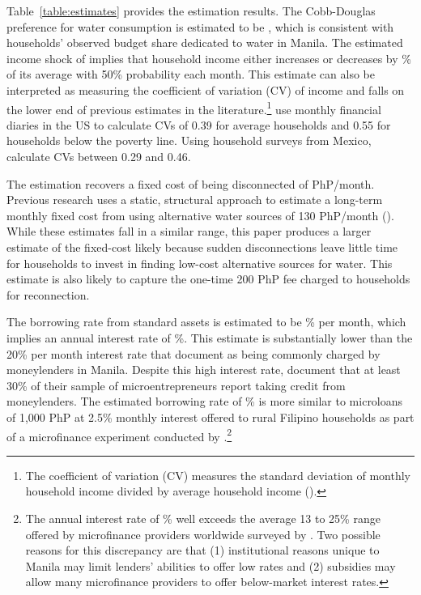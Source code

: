 \documentclass[12pt]{article}
\begin{document}
Table~\ref{table:estimates} provides the estimation results.  The Cobb-Douglas preference for water consumption is estimated to be \unskip, which is consistent with households' observed budget share dedicated to water in Manila.  The estimated income shock of implies that household income either increases or decreases by \unskip\% of its average with 50\% probability each month.  This estimate can also be interpreted as measuring the coefficient of variation (CV) of income and falls on the lower end of previous estimates in the literature.\footnote{The coefficient of variation (CV) measures the standard deviation of monthly household income divided by average household income (\cite{hannagan2015income}).}  \cite{hannagan2015income} use monthly financial diaries in the US to calculate CVs of 0.39 for average households and 0.55 for households below the poverty line.  Using household surveys from Mexico, \cite{amuedo2011remittances} calculate CVs between 0.29 and 0.46. %

The estimation recovers a fixed cost of being disconnected of PhP/month.  Previous research uses a static, structural approach to estimate a long-term monthly fixed cost from using alternative water sources of 130 PhP/month (\cite{wjv}).  While these estimates fall in a similar range, this paper produces a larger estimate of the fixed-cost likely because sudden disconnections leave little time for households to invest in finding low-cost alternative sources for water.  This estimate is also likely to capture the one-time 200 PhP fee charged to households for reconnection.

The borrowing rate from standard assets is estimated to be \unskip\% per month, which implies an annual interest rate of \unskip\%.  This estimate is substantially lower than the 20\% per month interest rate that \cite{karlan2009expanding} document as being commonly charged by moneylenders in Manila.  Despite this high interest rate, \cite{karlan2009expanding} document that at least 30\% of their sample of microentrepreneurs report taking credit from moneylenders.  The estimated borrowing rate of \unskip\% is more similar to microloans of 1,000 PhP at 2.5\% monthly interest offered to rural Filipino households as part of a microfinance experiment conducted by \cite{gine2014group}.\footnote{The annual interest rate of \unskip\% well exceeds the average 13 to 25\% range offered by microfinance providers worldwide surveyed by \cite{cull2009microfinance}.  Two possible reasons for this discrepancy are that (1) institutional reasons unique to Manila may limit lenders' abilities to offer low rates and (2) subsidies may allow many microfinance providers to offer below-market interest rates.}
\end{document}
